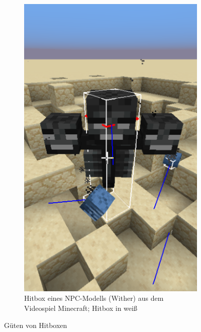 \begin{figure}
\begin{subfigure}[t]{0.2\textwidth}
		\includegraphics[width=1\textwidth]{./res/wither_hitbox.png}
		\caption{Hitbox eines NPC-Modells (Wither) aus dem Videospiel Minecraft; Hitbox in weiß}
		\label{fig:mwhitbox}
	\end{subfigure}

	\caption{Güten von Hitboxen}
	\label{fig:hitbox}
\end{figure}

